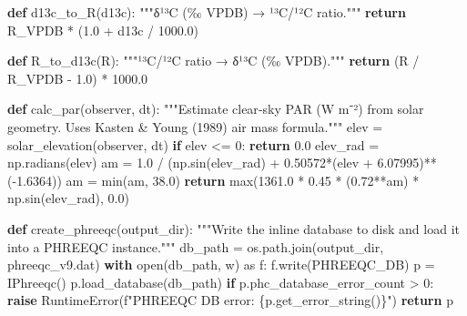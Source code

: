 \documentclass[
  letterpaper,
  DIV=11,
  numbers=noendperiod]{scrartcl}
\newenvironment{Shaded}{\begin{snugshade}}{\end{snugshade}}
\newcommand{\BuiltInTok}[1]{\textcolor[rgb]{0.00,0.23,0.31}{#1}}
\newcommand{\CommentTok}[1]{\textcolor[rgb]{0.37,0.37,0.37}{#1}}
\newcommand{\ControlFlowTok}[1]{\textcolor[rgb]{0.00,0.23,0.31}{\textbf{#1}}}
\newcommand{\DecValTok}[1]{\textcolor[rgb]{0.68,0.00,0.00}{#1}}
\newcommand{\FloatTok}[1]{\textcolor[rgb]{0.68,0.00,0.00}{#1}}
\newcommand{\ImportTok}[1]{\textcolor[rgb]{0.00,0.46,0.62}{#1}}
\newcommand{\KeywordTok}[1]{\textcolor[rgb]{0.00,0.23,0.31}{\textbf{#1}}}
\newcommand{\NormalTok}[1]{\textcolor[rgb]{0.00,0.23,0.31}{#1}}
\newcommand{\OperatorTok}[1]{\textcolor[rgb]{0.37,0.37,0.37}{#1}}
\newcommand{\PreprocessorTok}[1]{\textcolor[rgb]{0.68,0.00,0.00}{#1}}
\newcommand{\SpecialCharTok}[1]{\textcolor[rgb]{0.37,0.37,0.37}{#1}}
\newcommand{\SpecialStringTok}[1]{\textcolor[rgb]{0.13,0.47,0.30}{#1}}
\newcommand{\StringTok}[1]{\textcolor[rgb]{0.13,0.47,0.30}{#1}}
\begin{document}
\begin{Shaded}
\begin{Highlighting}[]
\KeywordTok{def}\NormalTok{ d13c\_to\_R(d13c):}
    \CommentTok{"""δ¹³C (‰ VPDB) → ¹³C/¹²C ratio."""}
    \ControlFlowTok{return}\NormalTok{ R\_VPDB }\OperatorTok{*}\NormalTok{ (}\FloatTok{1.0} \OperatorTok{+}\NormalTok{ d13c }\OperatorTok{/} \FloatTok{1000.0}\NormalTok{)}

\KeywordTok{def}\NormalTok{ R\_to\_d13c(R):}
    \CommentTok{"""¹³C/¹²C ratio → δ¹³C (‰ VPDB)."""}
    \ControlFlowTok{return}\NormalTok{ (R }\OperatorTok{/}\NormalTok{ R\_VPDB }\OperatorTok{{-}} \FloatTok{1.0}\NormalTok{) }\OperatorTok{*} \FloatTok{1000.0}

\KeywordTok{def}\NormalTok{ calc\_par(observer, dt):}
    \CommentTok{"""Estimate clear{-}sky PAR (W m⁻²) from solar geometry.}
\CommentTok{    Uses Kasten \& Young (1989) air mass formula."""}
\NormalTok{    elev }\OperatorTok{=}\NormalTok{ solar\_elevation(observer, dt)}
    \ControlFlowTok{if}\NormalTok{ elev }\OperatorTok{\textless{}=} \DecValTok{0}\NormalTok{:}
        \ControlFlowTok{return} \FloatTok{0.0}
\NormalTok{    elev\_rad }\OperatorTok{=}\NormalTok{ np.radians(elev)}
\NormalTok{    am }\OperatorTok{=} \FloatTok{1.0} \OperatorTok{/}\NormalTok{ (np.sin(elev\_rad) }\OperatorTok{+} \FloatTok{0.50572}\OperatorTok{*}\NormalTok{(elev }\OperatorTok{+} \FloatTok{6.07995}\NormalTok{)}\OperatorTok{**}\NormalTok{(}\OperatorTok{{-}}\FloatTok{1.6364}\NormalTok{))}
\NormalTok{    am }\OperatorTok{=} \BuiltInTok{min}\NormalTok{(am, }\FloatTok{38.0}\NormalTok{)}
    \ControlFlowTok{return} \BuiltInTok{max}\NormalTok{(}\FloatTok{1361.0} \OperatorTok{*} \FloatTok{0.45} \OperatorTok{*}\NormalTok{ (}\FloatTok{0.72}\OperatorTok{**}\NormalTok{am) }\OperatorTok{*}\NormalTok{ np.sin(elev\_rad), }\FloatTok{0.0}\NormalTok{)}


\KeywordTok{def}\NormalTok{ create\_phreeqc(output\_dir):}
    \CommentTok{"""Write the inline database to disk and load it into a PHREEQC instance."""}
\NormalTok{    db\_path }\OperatorTok{=}\NormalTok{ os.path.join(output\_dir, }\StringTok{\textquotesingle{}phreeqc\_v9.dat\textquotesingle{}}\NormalTok{)}
    \ControlFlowTok{with} \BuiltInTok{open}\NormalTok{(db\_path, }\StringTok{\textquotesingle{}w\textquotesingle{}}\NormalTok{) }\ImportTok{as}\NormalTok{ f:}
\NormalTok{        f.write(PHREEQC\_DB)}
\NormalTok{    p }\OperatorTok{=}\NormalTok{ IPhreeqc()}
\NormalTok{    p.load\_database(db\_path)}
    \ControlFlowTok{if}\NormalTok{ p.phc\_database\_error\_count }\OperatorTok{\textgreater{}} \DecValTok{0}\NormalTok{:}
        \ControlFlowTok{raise} \PreprocessorTok{RuntimeError}\NormalTok{(}\SpecialStringTok{f"PHREEQC DB error: }\SpecialCharTok{\{}\NormalTok{p}\SpecialCharTok{.}\NormalTok{get\_error\_string()}\SpecialCharTok{\}}\SpecialStringTok{"}\NormalTok{)}
    \ControlFlowTok{return}\NormalTok{ p}



\end{Highlighting}
\end{Shaded}
\end{document}
